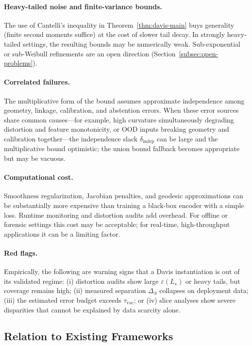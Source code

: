 \documentclass[11pt]{article}
\theoremstyle{remark}
\theoremstyle{plain}
\begin{document}
\paragraph{Heavy-tailed noise and finite-variance bounds.}
The use of Cantelli's inequality in Theorem~\ref{thm:davis-main} buys generality (finite second
moments suffice) at the cost of slower tail decay. In strongly heavy-tailed settings, the resulting
bounds may be numerically weak. Sub-exponential or sub-Weibull refinements are an open direction
(Section~\ref{subsec:open-problems}).

\paragraph{Correlated failures.}
The multiplicative form of the bound assumes approximate independence among
geometry, linkage, calibration, and abstention errors. When these error sources share common
causes---for example, high curvature simultaneously degrading distortion and feature monotonicity,
or OOD inputs breaking geometry and calibration together---the independence slack
$\delta_{\mathrm{indep}}$ can be large and the multiplicative bound optimistic; the union bound
fallback becomes appropriate but may be vacuous.

\paragraph{Computational cost.}
Smoothness regularization, Jacobian penalties, and geodesic approximations can be substantially
more expensive than training a black-box encoder with a simple loss. Runtime monitoring and
distortion audits add overhead. For offline or forensic settings this cost may be acceptable; for
real-time, high-throughput applications it can be a limiting factor.

\paragraph{Red flags.}
Empirically, the following are warning signs that a Davis instantiation is out of its validated regime:
(i) distortion audits show large $\varepsilon(L_\star)$ or heavy tails, but coverage remains high;
(ii) measured separation $\Delta_S$ collapses on deployment data; (iii) the estimated error budget
exceeds $\tau_{\mathrm{vac}}$; or (iv) slice analyses show severe disparities that cannot be explained by
data scarcity alone.

\subsection{Relation to Existing Frameworks}
\end{document}
